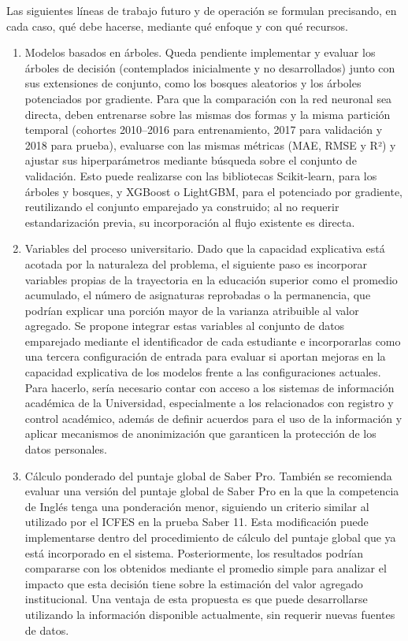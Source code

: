 Las siguientes líneas de trabajo futuro y de operación se formulan precisando, en cada caso, qué debe hacerse, mediante qué enfoque y con qué recursos.

\begin{enumerate}
	\item Modelos basados en árboles. Queda pendiente implementar y evaluar los árboles de decisión (contemplados inicialmente y no desarrollados) junto con sus extensiones de conjunto, como los bosques aleatorios y los árboles potenciados por gradiente. Para que la comparación con la red neuronal sea directa, deben entrenarse sobre las mismas dos formas y la misma partición temporal (cohortes 2010–2016 para entrenamiento, 2017 para validación y 2018 para prueba), evaluarse con las mismas métricas (MAE, RMSE y R²) y ajustar sus hiperparámetros mediante búsqueda sobre el conjunto de validación. Esto puede realizarse con las bibliotecas Scikit-learn, para los árboles y bosques, y XGBoost o LightGBM, para el potenciado por gradiente, reutilizando el conjunto emparejado ya construido; al no requerir estandarización previa, su incorporación al flujo existente es directa.
	\item Variables del proceso universitario. Dado que la capacidad explicativa está acotada por la naturaleza del problema, el siguiente paso es incorporar variables propias de la trayectoria en la educación superior como el promedio acumulado, el número de asignaturas reprobadas o la permanencia, que podrían explicar una porción mayor de la varianza atribuible al valor agregado. Se propone integrar estas variables al conjunto de datos emparejado mediante el identificador de cada estudiante e incorporarlas como una tercera configuración de entrada para evaluar si aportan mejoras en la capacidad explicativa de los modelos frente a las configuraciones actuales. Para hacerlo, sería necesario contar con acceso a los sistemas de información académica de la Universidad, especialmente a los relacionados con registro y control académico, además de definir acuerdos para el uso de la información y aplicar mecanismos de anonimización que garanticen la protección de los datos personales.
	\item Cálculo ponderado del puntaje global de Saber Pro. También se recomienda evaluar una versión del puntaje global de Saber Pro en la que la competencia de Inglés tenga una ponderación menor, siguiendo un criterio similar al utilizado por el ICFES en la prueba Saber 11. Esta modificación puede implementarse dentro del procedimiento de cálculo del puntaje global que ya está incorporado en el sistema. Posteriormente, los resultados podrían compararse con los obtenidos mediante el promedio simple para analizar el impacto que esta decisión tiene sobre la estimación del valor agregado institucional. Una ventaja de esta propuesta es que puede desarrollarse utilizando la información disponible actualmente, sin requerir nuevas fuentes de datos.

\end{enumerate}
